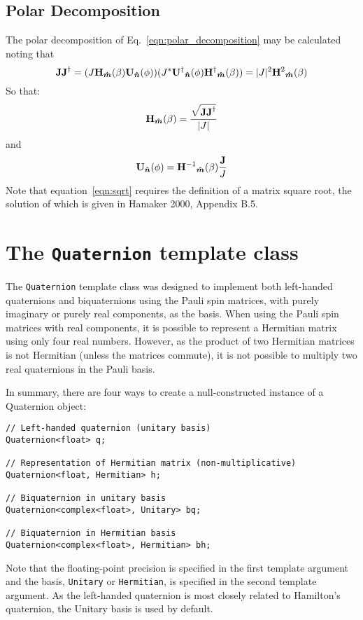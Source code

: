 \documentclass[12pt]{article}
\newcommand{\code}[1]{{\tt{#1}}}
\newcommand{\boost}[1][]{{\ensuremath{ {\bf H}{#1}_{\bm{\hat m}}(\beta) }}}
\newcommand{\rotat}[1][]{{\ensuremath{ {\bf U}{#1}_{\bm{\hat n}}(\phi) }}}
\begin{document}
\subsection{Polar Decomposition}
\label{sec:polar_decomposition}

The polar decomposition of Eq.~\ref{eqn:polar_decomposition} may be 
calculated noting that
\begin{equation}
{\bf JJ}^\dagger = (J\boost\rotat)(J^*\rotat[^\dagger]\boost[^\dagger])
	= |J|^2 \boost[^2]
\end{equation}
So that:
\begin{equation}\label{eqn:sqrt}
\boost = {\sqrt{{\bf JJ}^\dagger} \over |J|}
\end{equation}
and
\begin{equation}
\rotat = \boost[^{-1}] {{\bf J} \over J}
\end{equation}
Note that equation~\ref{eqn:sqrt} requires the definition of a matrix
square root, the solution of which is given in Hamaker 2000, Appendix B.5.

\section{The \code{Quaternion} template class}

The \code{Quaternion} template class was designed to implement both
left-handed quaternions and biquaternions using the Pauli spin
matrices, with purely imaginary or purely real components, as the
basis.  When using the Pauli spin matrices with real components, it is
possible to represent a Hermitian matrix using only four real numbers.
However, as the product of two Hermitian matrices is not Hermitian
(unless the matrices commute), it is not possible to multiply two real
quaternions in the Pauli basis.

In summary, there are four ways to create a null-constructed instance
of a Quaternion object:
\begin{verbatim}
// Left-handed quaternion (unitary basis)
Quaternion<float> q;

// Representation of Hermitian matrix (non-multiplicative)
Quaternion<float, Hermitian> h;

// Biquaternion in unitary basis
Quaternion<complex<float>, Unitary> bq;

// Biquaternion in Hermitian basis
Quaternion<complex<float>, Hermitian> bh;
\end{verbatim}
Note that the floating-point precision is specified in the first
template argument and the basis, \code{Unitary} or \code{Hermitian},
is specified in the second template argument. As the left-handed
quaternion is most closely related to Hamilton's quaternion, the
Unitary basis is used by default.
\end{document}
